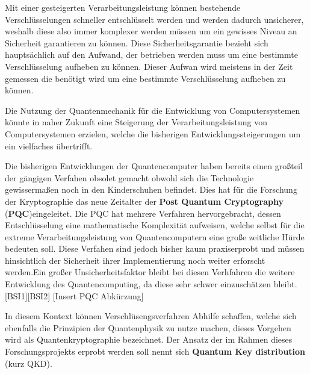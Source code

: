 Mit einer gesteigerten Verarbeitungsleistung können bestehende Verschlüsselungen schneller entschlüsselt werden und werden dadurch unsicherer, weshalb diese also immer komplexer werden müssen um ein gewisses Niveau an Sicherheit garantieren zu können.
Diese Sicherheitsgarantie bezieht sich hauptsächlich auf den Aufwand, der betrieben werden muss um eine bestimmte Verschlüsselung aufheben zu können. Dieser Aufwan wird meistens in der Zeit gemessen die benötigt wird um eine bestimmte Verschlüsselung aufheben zu können.

Die Nutzung der Quantenmechanik für die Entwicklung von Computersystemen könnte in naher Zukunft eine Steigerung der Verarbeitungsleistung von Computersystemen erzielen, welche die bisherigen Entwicklungssteigerungen um ein vielfaches übertrifft.

Die bisherigen Entwicklungen der Quantencomputer haben bereits einen großteil der gängigen Verfahen obsolet gemacht obwohl sich die Technologie gewissermaßen noch in den Kinderschuhen befindet. Dies hat für die Forschung der Kryptographie das neue Zeitalter der \textbf{Post Quantum Cryptography} (\textbf{PQC})eingeleitet. Die \ac{PQC} hat mehrere Verfahren hervorgebracht, dessen Entschlüsselung eine mathematische Komplexität aufweisen, welche selbst für die extreme Verarbeitungsleistung von Quantencomputern eine große zeitliche Hürde bedeuten soll. Diese Verfahen sind jedoch bisher kaum praxiserprobt und müssen hinsichtlich der Sicherheit ihrer Implementierung noch weiter erforscht werden.Ein großer Unsicherheitsfaktor bleibt bei diesen Verhfahren die weitere Entwicklung des Quantencomputing, da diese sehr schwer einzuschätzen bleibt.[BSI1][BSI2] [Insert PQC Abkürzung]

In diesem Kontext können Verschlüsengsverfahren Abhilfe schaffen, welche sich ebenfalls die Prinzipien der Quantenphysik zu nutze machen, dieses Vorgehen wird als Quantenkryptographie bezeichnet. Der Ansatz der im Rahmen dieses Forschungsprojekts erprobt werden soll nennt sich \textbf{Quantum Key distribution} (kurz \ac{QKD}).